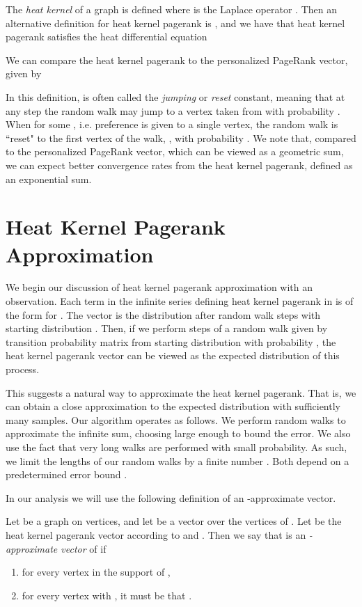 \documentclass[runningheads,a4paper]{llncs}
\begin{document}
The \emph{heat kernel} of a graph is defined  where 
is the Laplace operator .  Then an alternative definition for
heat kernel pagerank is , and we have that heat kernel pagerank
satisfies the heat differential equation


We can compare the heat kernel pagerank to the personalized PageRank vector,
given by

In this definition,  is often called the \emph{jumping} or \emph{reset}
constant, meaning that at any step the random walk may jump to a vertex taken
from  with probability .  When  for some , i.e.
preference is given to a single vertex, the random walk is ``reset" to the first
vertex of the walk, , with probability .  We note that, compared to
the personalized PageRank vector, which can be viewed as a geometric sum, we can
expect better convergence rates from the heat kernel pagerank, defined as an
exponential sum.

\section{Heat Kernel Pagerank Approximation}
\label{sec:hkprapprox}
We begin our discussion of heat kernel pagerank approximation with an
observation.  Each term in the infinite series defining heat kernel pagerank in
 is of the form  for
.  The vector  is the distribution after  random walk
steps with starting distribution .  Then, if we perform  steps of a random
walk given by transition probability matrix  from starting distribution 
with probability , the heat kernel pagerank vector
can be viewed as the expected distribution of this process.

This suggests a natural way to approximate the heat kernel pagerank.  That is,
we can obtain a close approximation to the expected distribution with
sufficiently many samples.  Our algorithm operates as follows.  We perform 
random walks to approximate the infinite sum, choosing  large enough to bound
the error.  We also use the fact that very long walks are performed with small
probability.  As such, we limit the lengths of our random walks by a finite
number .  Both  depend on a predetermined error bound .

In our analysis we will use the following definition of an
-approximate vector.

\begin{definition}
\label{def:eps-approx}
Let  be a graph on  vertices, and let  be a vector over
the vertices of .  Let  be the heat kernel pagerank vector according
to  and .  Then we say that  is an
\emph{-approximate vector} of  if
\begin{enumerate}
\item for every vertex  in the support of , 

\item for every vertex with , it must be that .
\end{enumerate}
\end{definition}
\end{document}
